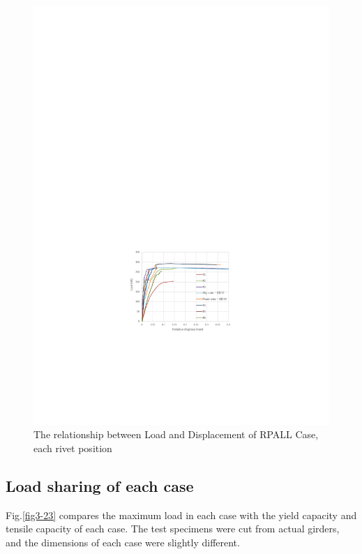 \begin{figure}[htbp]
\begin{minipage}[t]{0.48\textwidth}
    \includegraphics[width=\linewidth]{imgs/ch3/fig3-22.pdf}
    \caption{The relationship between Load and Displacement of RPALL Case, each rivet position}
    \label{fig3-22}
    \end{minipage}
\end{figure} 

\subsection{Load sharing of each case}

Fig.\ref{fig3-23} compares the maximum load in each case with the yield capacity and tensile capacity of each case. The test specimens were cut from actual girders, and the dimensions of each case were slightly different.

